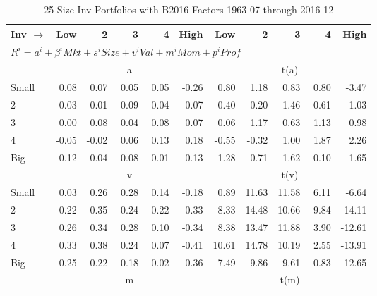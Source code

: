 
\begin{table}[!ht]
\centering
\caption{25-Size-Inv Portfolios with B2016 Factors 1963-07 through 2016-12}
\begin{tabular}{lrrrrrrrrrr}
  \toprule
    Inv $\rightarrow$ & Low & 2 & 3 & 4 & High & Low & 2 & 3 & 4 & High \\ 
  \midrule
  \multicolumn{11}{l}{$R^i=a^i+\beta^iMkt+s^iSize+v^iVal+m^iMom+p^iProf$} \\

  
    
      & \multicolumn{5}{c}{a} & \multicolumn{5}{c}{t(a)}
    
    \\
      \cmidrule(r){2-6} \cmidrule(r){7-11}

    Small   & 0.08  & 0.07  & 0.05  & 0.05  & -0.26  & 0.80  & 1.18  & 0.83  & 0.80  & -3.47  \\
         2  & -0.03  & -0.01  & 0.09  & 0.04  & -0.07  & -0.40  & -0.20  & 1.46  & 0.61  & -1.03  \\
         3  & 0.00  & 0.08  & 0.04  & 0.08  & 0.07  & 0.06  & 1.17  & 0.63  & 1.13  & 0.98  \\
         4  & -0.05  & -0.02  & 0.06  & 0.13  & 0.18  & -0.55  & -0.32  & 1.00  & 1.87  & 2.26  \\
    Big     & 0.12  & -0.04  & -0.08  & 0.01  & 0.13  & 1.28  & -0.71  & -1.62  & 0.10  & 1.65  \\

  
    
      & \multicolumn{5}{c}{v} & \multicolumn{5}{c}{t(v)}
    
    \\
      \cmidrule(r){2-6} \cmidrule(r){7-11}

    Small   & 0.03  & 0.26  & 0.28  & 0.14  & -0.18  & 0.89  & 11.63  & 11.58  & 6.11  & -6.64  \\
         2  & 0.22  & 0.35  & 0.24  & 0.22  & -0.33  & 8.33  & 14.48  & 10.66  & 9.84  & -14.11  \\
         3  & 0.26  & 0.34  & 0.28  & 0.10  & -0.34  & 8.38  & 13.47  & 11.88  & 3.90  & -12.61  \\
         4  & 0.33  & 0.38  & 0.24  & 0.07  & -0.41  & 10.61  & 14.78  & 10.19  & 2.55  & -13.91  \\
    Big     & 0.25  & 0.22  & 0.18  & -0.02  & -0.36  & 7.49  & 9.86  & 9.61  & -0.83  & -12.65  \\

  
    
      & \multicolumn{5}{c}{m} & \multicolumn{5}{c}{t(m)}
    

\end{tabular}
\end{table}
